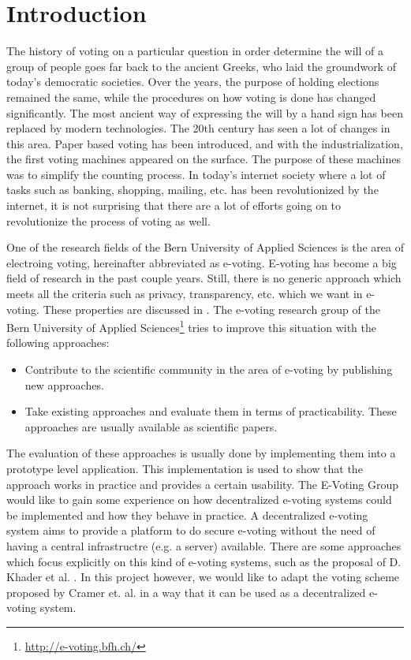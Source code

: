 \documentclass[numbers=noenddot, abstract=on, a4paper, headsepline,
footsepline, oneside, draft=off]{scrreprt}
\begin{document}
\chapter{Introduction}
\label{cha:introduction}
The history of voting on a particular question in order determine the will of a
group of people goes far back to the ancient Greeks, who laid the groundwork of
today's democratic societies. Over the years, the purpose of holding elections
remained the same, while the procedures on how voting is done has changed
significantly. The most ancient way of expressing the will by a hand sign has
been replaced by modern technologies. The 20th century has seen a lot of changes
in this area. Paper based voting has been introduced, and with the
industrialization, the first voting machines appeared on the surface. The
purpose of these machines was to simplify the counting process. In today's internet
society where a lot of tasks such as banking, shopping, mailing, etc. has been
revolutionized by the internet, it is not surprising that there are a lot of
efforts going on to revolutionize the process of voting as well.

One of the research fields of the Bern University of Applied Sciences is the
area of electroing voting, hereinafter abbreviated as e-voting. E-voting has
become a big field of research in the past couple years. Still, there is no
generic approach which meets all the criteria such as privacy, transparency,
etc. which we want in e-voting. These properties are discussed in
. The e-voting research group of the Bern University of
Applied Sciences\footnote{\url{http://e-voting.bfh.ch/}} tries to improve this
situation with the following approaches:
\begin{itemize}
  \item Contribute to the scientific community in the area of e-voting by
  publishing new approaches.
  \item Take existing approaches and evaluate them in terms of practicability.
  These approaches are usually available as scientific papers.
\end{itemize}

The evaluation of these approaches is usually done by implementing them into a
prototype level application. This implementation is used to show that the
approach works in practice and provides a certain usability. The E-Voting Group
would like to gain some experience on how decentralized e-voting systems could
be implemented and how they behave in practice. A decentralized e-voting system
aims to provide a platform to do secure e-voting without the need of having a
central infrastructre (e.g. a server) available. There are some approaches which
focus explicitly on this kind of e-voting systems, such as the proposal of D.
Khader et al. \cite{HKRS12}. In this project however, we would like to adapt the
voting scheme proposed by Cramer et. al. \cite{CGS97} in a way that it can be
used as a decentralized e-voting system.
\end{document}
